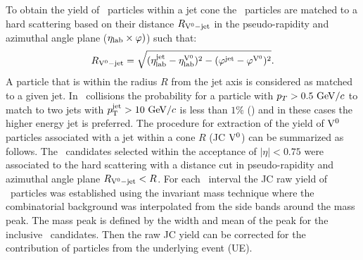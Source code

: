 To obtain the yield of \Vzero\ particles within a jet cone the \Vzero\ particles are matched to a hard scattering based on their distance $R_{{\rm V}^{0}-{\rm jet}}$ in the pseudo-rapidity and azimuthal angle plane ($\eta_{\rm lab} \times \varphi)$) such that:
\begin{equation}
R_{{\rm V}^{0}-{\rm jet}}=\sqrt{(\eta_{\rm lab}^{\rm jet} - \eta_{\rm lab}^{{\rm V}^{0}})^{2} - (\varphi^{\rm jet} - \varphi^{{\rm V}^{0}})^{2}}.	
\end{equation}
A particle that is within the radius $R$ from the jet axis is considered as matched to a given jet. 
In \pPb\ collisions the probability for a particle with $p_{T}>0.5~\mathrm{GeV}/c$ to match to two jets with $p_{\mathrm{T}}^{\mathrm{jet}} > 10~\mathrm{GeV}/c$ is less than $1\%$ () and in these cases the higher energy jet is preferred.
The procedure for extraction of the yield of ${\rm V}^{0}$ particles associated with a jet within a cone $R$ (JC ${\rm V}^{0}$) can be summarized as follows.
The \Vzero\ candidates selected within the acceptance of $|\eta|<0.75$ were associated to the hard scattering with a distance cut in pseudo-rapidity and azimuthal angle plane $R_{{\rm V}^{0}-{\rm jet}}<R$.
For each \pt\ interval the JC raw yield of \Vzero\ particles was established using the invariant mass technique where the combinatorial background was interpolated from the side bands around the mass peak. 
The mass peak is defined by the width and mean of the peak for the inclusive \Vzero\ candidates.
Then the raw JC yield can be corrected for the contribution of particles from the underlying event (UE).


